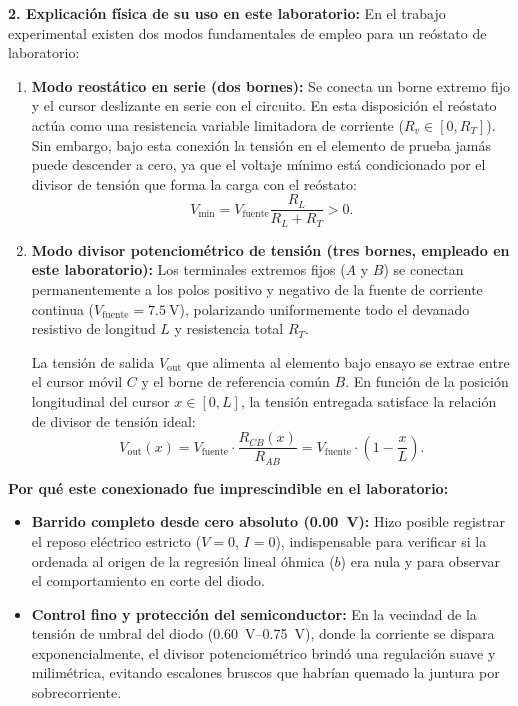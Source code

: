 \begin{appendices}
\textbf{2. Explicación física de su uso en este laboratorio:}  
En el trabajo experimental existen dos modos fundamentales de empleo para un reóstato de laboratorio:
\begin{enumerate}
    \item \textbf{Modo reostático en serie (dos bornes):} Se conecta un borne extremo fijo y el cursor deslizante en serie con el circuito. En esta disposición el reóstato actúa como una resistencia variable limitadora de corriente ($R_v \in [0, R_T]$). Sin embargo, bajo esta conexión la tensión en el elemento de prueba jamás puede descender a cero, ya que el voltaje mínimo está condicionado por el divisor de tensión que forma la carga con el reóstato:
    \begin{equation}
        V_{\text{min}} = V_{\text{fuente}} \frac{R_L}{R_L + R_T} > 0.
    \end{equation}
    
    \item \textbf{Modo divisor potenciométrico de tensión (tres bornes, empleado en este laboratorio):}  
    Los terminales extremos fijos ($A$ y $B$) se conectan permanentemente a los polos positivo y negativo de la fuente de corriente continua ($V_{\text{fuente}} = \qty{7,5}{\volt}$), polarizando uniformemente todo el devanado resistivo de longitud $L$ y resistencia total $R_T$.
    
    La tensión de salida $V_{\text{out}}$ que alimenta al elemento bajo ensayo se extrae entre el cursor móvil $C$ y el borne de referencia común $B$. En función de la posición longitudinal del cursor $x \in [0, L]$, la tensión entregada satisface la relación de divisor de tensión ideal:
    \begin{equation}
        V_{\text{out}}(x) = V_{\text{fuente}} \cdot \frac{R_{CB}(x)}{R_{AB}} = V_{\text{fuente}} \cdot \left( 1 - \frac{x}{L} \right).
    \end{equation}
\end{enumerate}

\textbf{Por qué este conexionado fue imprescindible en el laboratorio:}
\begin{itemize}
    \item \textbf{Barrido completo desde cero absoluto (\qty{0,00}{\volt}):} Hizo posible registrar el reposo eléctrico estricto ($V = 0$, $I = 0$), indispensable para verificar si la ordenada al origen de la regresión lineal óhmica ($b$) era nula y para observar el comportamiento en corte del diodo.
    \item \textbf{Control fino y protección del semiconductor:} En la vecindad de la tensión de umbral del diodo (\qtyrange{0,60}{0,75}{\volt}), donde la corriente se dispara exponencialmente, el divisor potenciométrico brindó una regulación suave y milimétrica, evitando escalones bruscos que habrían quemado la juntura por sobrecorriente.
\end{itemize}


\end{appendices}
